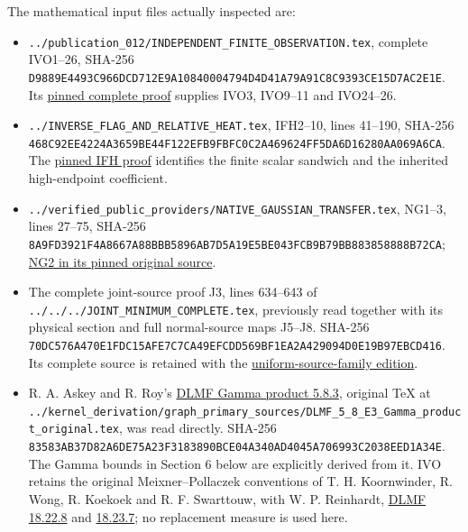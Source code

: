\documentclass[11pt]{article}
\begin{document}
The mathematical input files actually inspected are:

\begin{itemize}
\tightlist
\item
  \nolinkurl{../publication_012/INDEPENDENT_FINITE_OBSERVATION.tex}, complete IVO1--26, SHA-256 \nolinkurl{D9889E4493C966DCD712E9A10840004794D4D41A79A91C8C9393CE15D7AC2E1E}. Its \href{https://github.com/KokunoYumeto/zeta-function-research-reader/blob/edd4008690952fb8568a01744e49ad7e180401e9/workbenches/splitzero-tandem/continuations/20260921-original-observation/INDEPENDENT_FINITE_OBSERVATION.tex}{pinned complete proof} supplies IVO3, IVO9--11 and IVO24--26.
\item
  \nolinkurl{../INVERSE_FLAG_AND_RELATIVE_HEAT.tex}, IFH2--10, lines 41--190, SHA-256 \nolinkurl{468C92EE4224A3659BE44F122EFB9FBFC0C2A469624FF5DA6D16280AA069A6CA}. The \href{https://github.com/KokunoYumeto/zeta-function-research-reader/blob/edd4008690952fb8568a01744e49ad7e180401e9/workbenches/splitzero-tandem/continuations/20260921-original-observation/INVERSE_FLAG_AND_RELATIVE_HEAT.tex\#L41}{pinned IFH proof} identifies the finite scalar sandwich and the inherited high-endpoint coefficient.
\item
  \nolinkurl{../verified_public_providers/NATIVE_GAUSSIAN_TRANSFER.tex}, NG1--3, lines 27--75, SHA-256 \nolinkurl{8A9FD3921F4A8667A88BBB5896AB7D5A19E5BE043FCB9B79BB883858888B72CA}; \href{https://github.com/KokunoYumeto/zeta-function-research-reader/blob/5992ad50c0f2a06921f1fcaded7b4e38097c0739/workbenches/splitzero-tandem/continuations/20260920-original-kernel-mixed-determinants/providers/NATIVE_GAUSSIAN_TRANSFER.tex\#L50}{NG2 in its pinned original source}.
\item
  The complete joint-source proof J3, lines 634--643 of \nolinkurl{../../../JOINT_MINIMUM_COMPLETE.tex}, previously read together with its physical section and full normal-source maps J5--J8. SHA-256 \nolinkurl{70DC576A470E1FDC15AFE7C7CA49EFCDD569BF1EA2A429094D0E19B97EBCD416}. Its complete source is retained with the \href{https://github.com/KokunoYumeto/zeta-function-research-reader/blob/f1ad8be11f329a12d562420edfa58fa464948ee2/workbenches/splitzero-tandem/continuations/20260921-uniform-source-family/JOINT_MINIMUM_COMPLETE.tex\#L634}{uniform-source-family edition}.
\item
  R. A. Askey and R. Roy's \href{https://dlmf.nist.gov/5.8.E3}{DLMF Gamma product 5.8.3}, original TeX at \nolinkurl{../kernel_derivation/graph_primary_sources/DLMF_5_8_E3_Gamma_product_original.tex}, was read directly. SHA-256 \nolinkurl{83583AB37D82A6DE75A23F3183890BCE04A340AD4045A706993C2038EED1A34E}. The Gamma bounds in Section 6 below are explicitly derived from it. IVO retains the original Meixner--Pollaczek conventions of T. H. Koornwinder, R. Wong, R. Koekoek and R. F. Swarttouw, with W. P. Reinhardt, \href{https://dlmf.nist.gov/18.22.E8}{DLMF 18.22.8} and \href{https://dlmf.nist.gov/18.23.E7}{18.23.7}; no replacement measure is used here.
\end{itemize}
\end{document}
